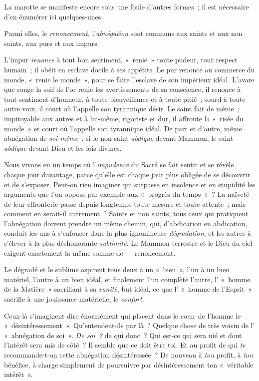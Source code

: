 \documentclass[french,twoside]{book} %
\begin{document}
\noindent La marotte se manifeste encore sous une foule d’autres formes ; il est nécessaire d’en énumérer ici quelques-unes.\par
Parmi elles, le \emph{renoncement}, l’\emph{abnégation} sont communs aux saints et aux non saints, aux purs et aux impurs.\par
L’impur \emph{renonce} à tout bon sentiment, « renie » toute pudeur, tout respect humain ; il obéit en esclave docile à ses appétits. Le pur renonce au commerce du monde, « renie le monde », pour se faire l’esclave de son impérieux idéal. L’avare que ronge la soif de l’or renie les avertissements de sa conscience, il renonce à tout sentiment d’honneur, à toute bienveillance et à toute pitié ; sourd à toute autre voix, il court où l’appelle son tyrannique désir. Le saint fait de même ; impitoyable aux autres et à lui-même, rigoriste et dur, il affronte la « risée du monde » et court où l’appelle son tyrannique idéal. De part et d’autre, même abnégation de \emph{soi-même : }si le non saint \emph{abdique} devant Mammon, le saint \emph{abdique} devant Dieu et les lois divines.\par
Nous vivons en un temps où l’\emph{impudence} du Sacré se fait sentir et se révèle chaque jour davantage, parce qu’elle est chaque jour plus obligée de se découvrir et de s’exposer. Peut-on rien imaginer qui surpasse en  insolence et en stupidité les arguments que l’on oppose par exemple aux « progrès du temps » ? La naïveté de leur effronterie passe depuis longtemps toute mesure et toute attente ; mais comment en serait-il autrement ? Saints et non saints, tous ceux qui pratiquent l’abnégation doivent prendre un même chemin, qui, d’abdication en abdication, conduit les uns à s’enfoncer dans la plus ignomineuse \emph{dégradation}, et les autres à s’élever à la plus déshonorante \emph{sublimité}. Le Mammon terrestre et le Dieu du ciel exigent exactement la même somme de — renoncement.\par
Le dégradé et le sublime aspirent tous deux à un « bien », l’un à un bien matériel, l’autre à un bien idéal, et finalement l’un complète l’autre, l’ « homme de la Matière » sacrifiant à sa \emph{vanité}, but idéal, ce que l’ « homme de l’Esprit » sacrifie à une jouissance matérielle, le \emph{confort}.\par
Ceux-là s’imaginent dire énormément qui placent dans le cœur de l’homme le « désintéressement ». Qu’entendent-ils par là ? Quelque chose de très voisin de l’ « abnégation de soi ». \emph{De soi ?} de qui donc ? Qui est-ce qui sera nié et dont l’intérêt sera mis de côté ? Il semble que ce doit être toi. Et au profit de qui \emph{te} recommande-t-on cette abnégation désintéressée ? De nouveau à \emph{ton} profit, à \emph{ton} bénéfice, à charge simplement de poursuivre par désintéressement ton « véritable intérêt ».\par
\end{document}
